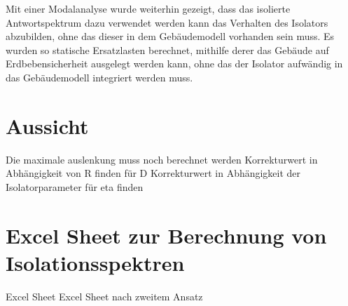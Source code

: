 Mit einer Modalanalyse wurde weiterhin gezeigt, dass das isolierte Antwortspektrum dazu verwendet werden kann das Verhalten des Isolators abzubilden, ohne das dieser in dem Gebäudemodell vorhanden sein muss.
Es wurden so statische Ersatzlasten berechnet, mithilfe derer das Gebäude auf Erdbebensicherheit ausgelegt werden kann, ohne das der Isolator aufwändig in das Gebäudemodell integriert werden muss.


\section{Aussicht}

Die maximale auslenkung muss noch berechnet werden
Korrekturwert in Abhängigkeit von R finden für D
Korrekturwert in Abhängigkeit der Isolatorparameter  für eta finden

\section{Excel Sheet zur Berechnung von Isolationsspektren}

Excel Sheet
	Excel Sheet nach zweitem Ansatz

\pagebreak